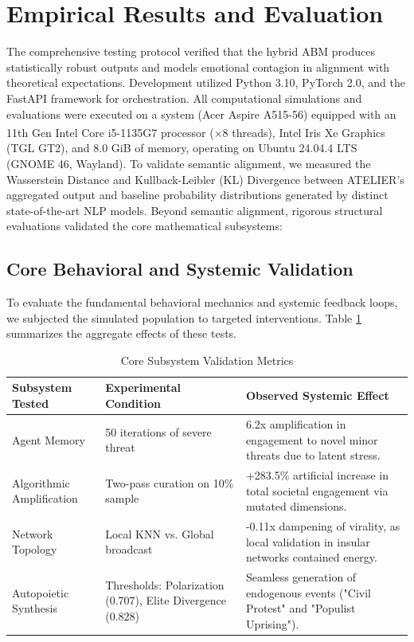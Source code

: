 \documentclass[12pt]{IEEEtran}
\begin{document}
\section{Empirical Results and Evaluation}
\label{sec:testing}

The comprehensive testing protocol verified that the hybrid ABM produces statistically robust outputs and models emotional contagion in alignment with theoretical expectations. Development utilized Python 3.10, PyTorch 2.0, and the FastAPI framework for orchestration. All computational simulations and evaluations were executed on a system (Acer Aspire A515-56) equipped with an 11th Gen Intel\textsuperscript{\textregistered} Core\textsuperscript{\texttrademark} i5-1135G7 processor ($\times 8$ threads), Intel\textsuperscript{\textregistered} Iris\textsuperscript{\textregistered} Xe Graphics (TGL GT2), and 8.0 GiB of memory, operating on Ubuntu 24.04.4 LTS (GNOME 46, Wayland). To validate semantic alignment, we measured the Wasserstein Distance and Kullback-Leibler (KL) Divergence between ATELIER's aggregated output and baseline probability distributions generated by distinct state-of-the-art NLP models. Beyond semantic alignment, rigorous structural evaluations validated the core mathematical subsystems:

\subsection{Core Behavioral and Systemic Validation}
To evaluate the fundamental behavioral mechanics and systemic feedback loops, we subjected the simulated population to targeted interventions. Table \ref{tab:core_validation} summarizes the aggregate effects of these tests.

\begin{table}[htbp]
\caption{Core Subsystem Validation Metrics}
\begin{center}
\begin{tabularx}{\columnwidth}{|l|X|X|}
\hline
\textbf{Subsystem Tested} & \textbf{Experimental Condition} & \textbf{Observed Systemic Effect} \\
\hline
Agent Memory & 50 iterations of severe threat & 6.2x amplification in engagement to novel minor threats due to latent stress. \\
\hline
Algorithmic Amplification & Two-pass curation on 10\% sample & +283.5\% artificial increase in total societal engagement via mutated dimensions. \\
\hline
Network Topology & Local KNN vs. Global broadcast & -0.11x dampening of virality, as local validation in insular networks contained energy. \\
\hline
Autopoietic Synthesis & Thresholds: Polarization (0.707), Elite Divergence (0.828) & Seamless generation of endogenous events ("Civil Protest" and "Populist Uprising"). \\
\hline
\end{tabularx}
\label{tab:core_validation}
\end{center}
\end{table}
\end{document}
